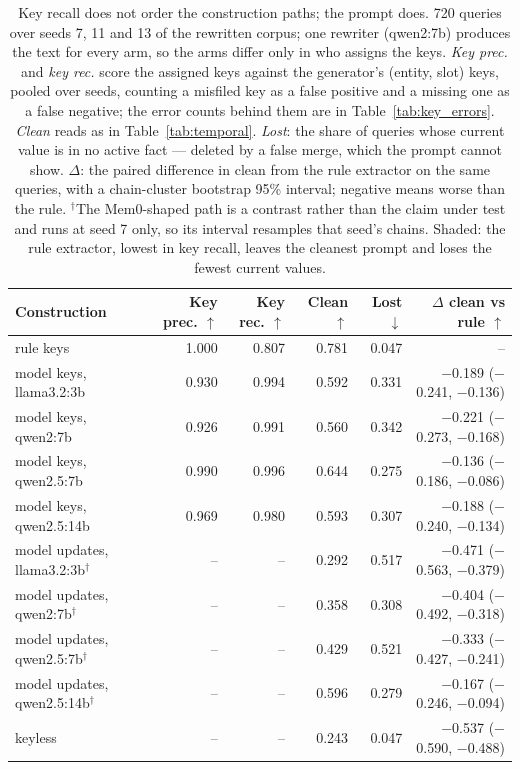 \documentclass{article} %
\begin{document}
\begin{table}[h]
\centering
\small
\setlength{\tabcolsep}{4pt}
\begin{tabular}{@{}lrrrrr@{}}
\toprule
Construction & Key prec. $\uparrow$ & Key rec. $\uparrow$ & Clean $\uparrow$ & Lost $\downarrow$ & $\Delta$ clean vs rule $\uparrow$ \\
\midrule
rule keys & 1.000 & 0.807 & \cellcolor{cPos!60}0.781 & \cellcolor{cPos!60}0.047 & -- \\
\quad model keys, llama3.2:3b & 0.930 & 0.994 & 0.592 & 0.331 & $-$0.189 {\scriptsize($-$0.241, $-$0.136)} \\
\quad model keys, qwen2:7b & 0.926 & 0.991 & 0.560 & 0.342 & $-$0.221 {\scriptsize($-$0.273, $-$0.168)} \\
\quad model keys, qwen2.5:7b & 0.990 & 0.996 & 0.644 & 0.275 & $-$0.136 {\scriptsize($-$0.186, $-$0.086)} \\
\quad model keys, qwen2.5:14b & 0.969 & 0.980 & 0.593 & 0.307 & $-$0.188 {\scriptsize($-$0.240, $-$0.134)} \\
\midrule
model updates, llama3.2:3b$^\dagger$ & -- & -- & 0.292 & 0.517 & $-$0.471 {\scriptsize($-$0.563, $-$0.379)} \\
model updates, qwen2:7b$^\dagger$ & -- & -- & 0.358 & 0.308 & $-$0.404 {\scriptsize($-$0.492, $-$0.318)} \\
model updates, qwen2.5:7b$^\dagger$ & -- & -- & 0.429 & 0.521 & $-$0.333 {\scriptsize($-$0.427, $-$0.241)} \\
model updates, qwen2.5:14b$^\dagger$ & -- & -- & 0.596 & 0.279 & $-$0.167 {\scriptsize($-$0.246, $-$0.094)} \\
keyless & -- & -- & 0.243 & 0.047 & $-$0.537 {\scriptsize($-$0.590, $-$0.488)} \\
\bottomrule
\end{tabular}
\caption{Key recall does not order the construction paths; the prompt does. 720 queries over seeds 7, 11 and 13 of the rewritten corpus; one rewriter (qwen2:7b) produces the text for every arm, so the arms differ only in who assigns the keys. \emph{Key prec.} and \emph{key rec.} score the assigned keys against the generator's (entity, slot) keys, pooled over seeds, counting a misfiled key as a false positive and a missing one as a false negative; the error counts behind them are in Table~\ref{tab:key_errors}. \emph{Clean} reads as in Table~\ref{tab:temporal}. \emph{Lost}: the share of queries whose current value is in no active fact --- deleted by a false merge, which the prompt cannot show. $\Delta$: the paired difference in clean from the rule extractor on the same queries, with a chain-cluster bootstrap 95\% interval; negative means worse than the rule. $^\dagger$The Mem0-shaped path is a contrast rather than the claim under test and runs at seed 7 only, so its interval resamples that seed's chains. Shaded: the rule extractor, lowest in key recall, leaves the cleanest prompt and loses the fewest current values.}
\label{tab:extractor}
\end{table}
\end{document}
